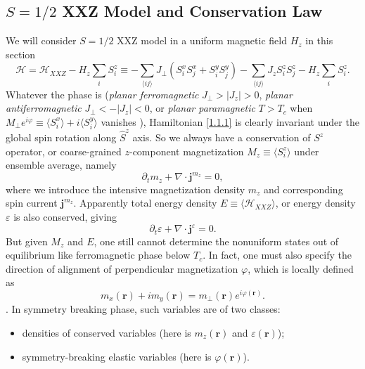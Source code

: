 \documentclass[10pt,nofootinbib]{revtex4}
\def\H{\mathcal{H}}
\begin{document}
	\subsection{$S=1/2$ XXZ Model and Conservation Law}
		We will consider $S=1/2$ XXZ model in a uniform magnetic field $H_z$ in this section
		\begin{equation}\label{1.1.1}
			\H=\H_{XXZ}-H_z\sum_i S_i^z\equiv-\sum_{\langle ij\rangle}J_\perp(S_i^xS_j^x+S_i^yS_j^y)-\sum_{\langle ij\rangle}J_zS_i^zS_j^z-H_z\sum_i S_i^z.
		\end{equation}
		Whatever the phase is (\emph{planar ferromagnetic} $J_\perp>|J_z|>0$, \emph{planar antiferromagnetic} $J_\perp<-|J_z|<0$, or \emph{planar paramagnetic} $T>T_c$ when $M_\perp e^{i\varphi}\equiv\langle S_i^x\rangle+i\langle S_i^y\rangle$ vanishes \cite{halperin1969hydrodynamic,chaikin2000principles}), Hamiltonian \eqref{1.1.1} is clearly invariant under the global spin rotation along $\hat{S}^z$ axis. So we always have a conservation of $S^z$ operator, or coarse-grained $z$-component magnetization $M_z\equiv\langle S_i^z\rangle$ under ensemble average, namely
		\begin{equation}\label{1.1.2}
			\partial_t m_z+\nabla\cdot\bm{j}^{m_z}=0,
		\end{equation}
		where we introduce the intensive magnetization density $m_z$ and corresponding spin current $\bm{j}^{m_z}$. Apparently total energy density $E\equiv\langle \H_{XXZ}\rangle$, or energy density $\varepsilon$ is also conserved, giving
		\begin{equation}\label{1.1.3}
			\partial_t \varepsilon+\nabla\cdot\bm{j}^\varepsilon=0.
		\end{equation}
		\indent But given $M_z$ and $E$, one still cannot determine the nonuniform states out of equilibrium like ferromagnetic phase below $T_c$. In fact, one must also specify the direction of alignment of perpendicular magnetization $\varphi$, which is locally defined as
		\begin{equation*}
			m_x(\bm{r})+im_y(\bm{r})=m_\perp(\bm{r})e^{i\varphi(\bm{r})}.
		\end{equation*}
		. In symmetry breaking phase, such variables are of two classes:
		\begin{itemize}
			\item densities of conserved variables (here is $m_z(\bm{r})$ and $\varepsilon(\bm{r})$);
			\item symmetry-breaking elastic variables (here is $\varphi(\bm{r})$).
		\end{itemize}
\end{document}
